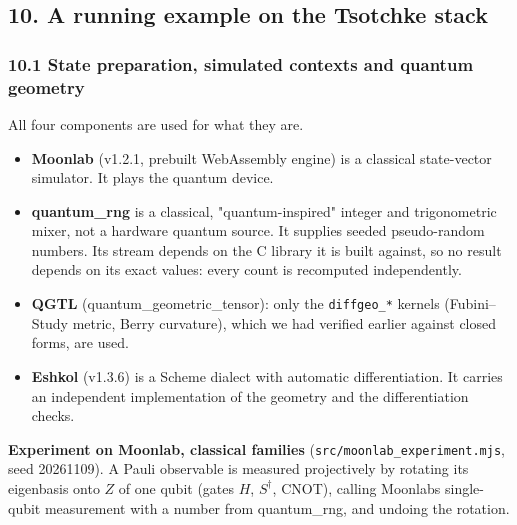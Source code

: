 \documentclass[11pt,a4paper]{article}
\providecommand{\tightlist}{\setlength{\itemsep}{0pt}\setlength{\parskip}{0pt}}
\begin{document}
\subsection{10. A running example on the Tsotchke stack}\label{10-a-running-example-on-the-tsotchke-stack}

\subsubsection{10.1 State preparation, simulated contexts and quantum geometry}\label{101-state-preparation-simulated-contexts-and-quantum-geometry}

All four components are used for what they are.

\begin{itemize}
\tightlist
\item
  \textbf{Moonlab} (v1.2.1, prebuilt WebAssembly engine) is a classical state-vector simulator. It plays
  the quantum device.
\item
  \textbf{quantum\_rng} is a classical, "quantum-inspired" integer and trigonometric mixer, not a hardware
  quantum source. It supplies seeded pseudo-random numbers. Its stream depends on the C library it is
  built against, so no result depends on its exact values: every count is recomputed independently.
\item
  \textbf{QGTL} (quantum\_geometric\_tensor): only the \texttt{diffgeo\_*} kernels (Fubini--Study metric, Berry
  curvature), which we had verified earlier against closed forms, are used.
\item
  \textbf{Eshkol} (v1.3.6) is a Scheme dialect with automatic differentiation. It carries an independent
  implementation of the geometry and the differentiation checks.
\end{itemize}

\textbf{Experiment on Moonlab, classical families} (\nolinkurl{src/moonlab_experiment.mjs}, seed 20261109). A Pauli
observable is measured projectively by rotating its eigenbasis onto \(Z\) of one qubit (gates \(H\),
\(S^\dagger\), CNOT), calling Moonlab\textquotesingle s single-qubit measurement with a number from quantum\_rng, and
undoing the rotation.
\end{document}
